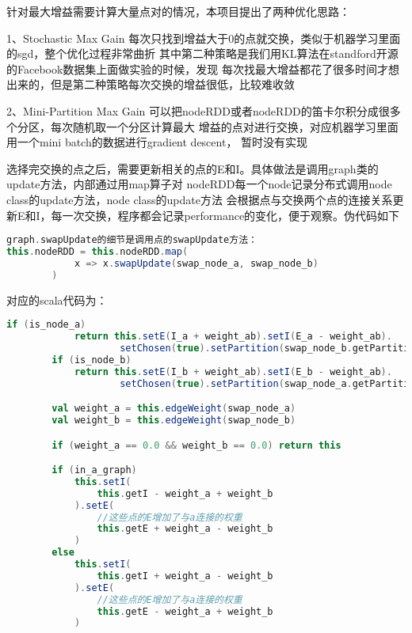 针对最大增益需要计算大量点对的情况，本项目提出了两种优化思路：

1、Stochastic Max Gain
每次只找到增益大于0的点就交换，类似于机器学习里面的sgd，整个优化过程非常曲折
其中第二种策略是我们用KL算法在standford开源的Facebook数据集上面做实验的时候，发现
每次找最大增益都花了很多时间才想出来的，但是第二种策略每次交换的增益很低，比较难收敛

2、Mini-Partition Max Gain
可以把nodeRDD或者nodeRDD的笛卡尔积分成很多个分区，每次随机取一个分区计算最大
增益的点对进行交换，对应机器学习里面用一个mini batch的数据进行gradient descent，
暂时没有实现

选择完交换的点之后，需要更新相关的点的E和I。具体做法是调用graph类的update方法，内部通过用map算子对
nodeRDD每一个node记录分布式调用node class的update方法，node class的update方法
会根据点与交换两个点的连接关系更新E和I，每一次交换，程序都会记录performance的变化，便于观察。伪代码如下

\begin{lstlisting}[language=Scala]
graph.swapUpdate的细节是调用点的swapUpdate方法：
this.nodeRDD = this.nodeRDD.map(
            x => x.swapUpdate(swap_node_a, swap_node_b)
        )
\end{lstlisting}


对应的scala代码为：

\begin{lstlisting}[language=Scala]
if (is_node_a)
            return this.setE(I_a + weight_ab).setI(E_a - weight_ab).
                    setChosen(true).setPartition(swap_node_b.getPartition)
        if (is_node_b)
            return this.setE(I_b + weight_ab).setI(E_b - weight_ab).
                    setChosen(true).setPartition(swap_node_a.getPartition)

        val weight_a = this.edgeWeight(swap_node_a)
        val weight_b = this.edgeWeight(swap_node_b)

        if (weight_a == 0.0 && weight_b == 0.0) return this

        if (in_a_graph)
            this.setI(
                this.getI - weight_a + weight_b
            ).setE(
                //这些点的E增加了与a连接的权重
                this.getE + weight_a - weight_b
            )
        else
            this.setI(
                this.getI + weight_a - weight_b
            ).setE(
                //这些点的E增加了与a连接的权重
                this.getE - weight_a + weight_b
            )

\end{lstlisting}

